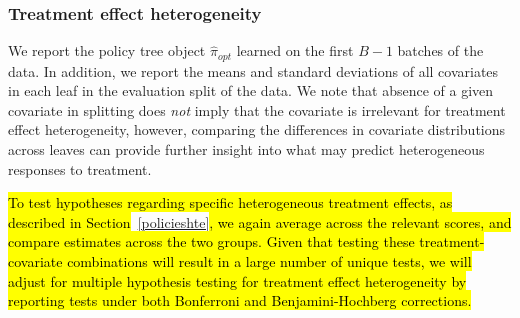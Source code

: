 \documentclass[letterpaper, 12pt, parskip=full,]{scrartcl}
\begin{document}
\subsubsection{Treatment effect heterogeneity}
We report the policy tree object $\hat{\pi}_{opt}$ learned on the first $B-1$ batches of the data. In addition, we report the means and standard deviations of all covariates in each leaf in the evaluation split of the data. We note that absence of a given covariate in splitting does \textit{not} imply that the covariate is irrelevant for treatment effect heterogeneity, however, comparing the differences in covariate distributions across leaves can provide further insight into what may predict heterogeneous responses to treatment. 

\hl{To test hypotheses regarding specific heterogeneous treatment effects, as described in Section}~\ref{policieshte}\hl{, we again average across the relevant scores, and compare estimates across the two groups. Given that testing these treatment-covariate combinations will result in a large number of unique tests, we will adjust for multiple hypothesis testing for treatment effect heterogeneity by reporting tests under both Bonferroni and Benjamini-Hochberg corrections.}
\end{document}
